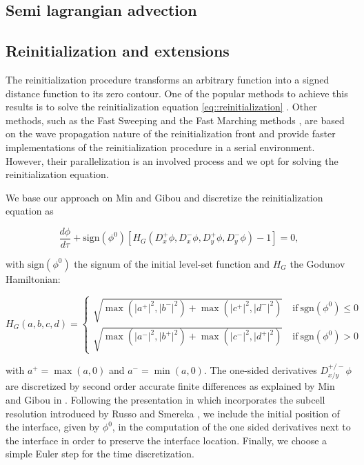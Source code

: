 \documentclass{elsarticle}
\begin{document}
\subsection{Semi lagrangian advection}

\subsection{Reinitialization and extensions} \label{section::reinitialization}

The reinitialization procedure transforms an arbitrary function into a signed distance function to its zero contour. One of the popular methods to achieve this results is to solve the reinitialization equation \ref{eq::reinitialization} \cite{Sussman;Smereka;Osher:94:A-Level-Set-Approach, Min;Gibou:07:A-second-order-accur}. Other methods, such as the Fast Sweeping \cite{Zhao:04:A-Fast-Sweeping-Meth} and the Fast Marching methods \cite{Sethian:96:A-Fast-Marching-Leve, Chopp:01:Some-improvements-of}, are based on the wave propagation nature of the reinitialization front and provide faster implementations of the reinitialization procedure in a serial environment. However, their parallelization is an involved process and we opt for solving the reinitialization equation.

We base our approach on Min and Gibou \cite{Min;Gibou:07:A-second-order-accur} and discretize the reinitialization equation as

\begin{equation*}
\frac{d\phi}{d\tau} + \mathrm{sign}(\phi^0)[H_G(D^+_x\phi, D^-_x\phi, D^+_y\phi, D^-_y\phi)-1] = 0,
\end{equation*}

with $\mathrm{sign}(\phi^0)$ the signum of the initial level-set function and $H_G$ the Godunov Hamiltonian:

\begin{equation*}
H_G(a,b,c,d) =
\begin{cases}
\sqrt{\max(\lvert a^+ \rvert^2, \lvert b^- \rvert^2) + \max(\lvert c^+ \rvert^2, \lvert d^- \rvert^2)} \quad \mathrm{if~sgn}(\phi^0) \leq 0\\
\sqrt{\max(\lvert a^- \rvert^2, \lvert b^+ \rvert^2) + \max(\lvert c^- \rvert^2, \lvert d^+ \rvert^2)} \quad \mathrm{if~sgn}(\phi^0) > 0
\end{cases}
\end{equation*}

with $a^+=\max(a,0)$ and $a^-=\min(a,0)$. The one-sided derivatives $D^{+/-}_{x/y}\phi$ are discretized by second order accurate finite differences as explained by Min and Gibou in \cite{Min;Gibou:07:A-second-order-accur}. Following the presentation in \cite{Min;Gibou:07:A-second-order-accur} which incorporates the subcell resolution introduced by Russo and Smereka \cite{Russo;Smereka:00:A-Remark-on-Computin}, we include the initial position of the interface, given by $\phi^0$, in the computation of the one sided derivatives next to the interface in order to preserve the interface location. Finally, we choose a simple Euler step for the time discretization.
\end{document}
